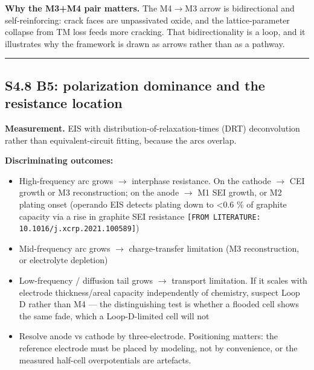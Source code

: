 \documentclass[11pt,a4paper]{article}
\begin{document}
\textbf{Why the M3+M4 pair matters.} The M4\ensuremath{\rightarrow}M3 arrow is bidirectional and self-reinforcing: crack faces are unpassivated oxide, and the lattice-parameter collapse from TM loss feeds more cracking. That bidirectionality is a loop, and it illustrates why the framework is drawn as arrows rather than as a pathway.


\par\noindent\rule{\linewidth}{0.4pt}\par


\subsection*{S4.8 B5: polarization dominance and the resistance location}


\textbf{Measurement.} EIS with distribution-of-relaxation-times (DRT) deconvolution rather than equivalent-circuit fitting, because the arcs overlap.


\textbf{Discriminating outcomes:}


\begin{itemize}
  \item High-frequency arc grows \ensuremath{\rightarrow} interphase resistance. On the cathode \ensuremath{\rightarrow} CEI growth or M3 reconstruction; on the anode \ensuremath{\rightarrow} M1 SEI growth, or M2 plating onset (operando EIS detects plating down to <0.6 \% of graphite capacity via a rise in graphite SEI resistance \texttt{[FROM LITERATU}\hspace{0pt}\texttt{RE: 10.1016/j.}\hspace{0pt}\texttt{xcrp.2021.}\hspace{0pt}\texttt{100589]})
  \item Mid-frequency arc grows \ensuremath{\rightarrow} charge-transfer limitation (M3 reconstruction, or electrolyte depletion)
  \item Low-frequency / diffusion tail grows \ensuremath{\rightarrow} transport limitation. If it scales with electrode thickness/areal capacity independently of chemistry, suspect Loop D rather than M4 --- the distinguishing test is whether a flooded cell shows the same fade, which a Loop-D-limited cell will not
  \item Resolve anode vs cathode by three-electrode. Positioning matters: the reference electrode must be placed by modeling, not by convenience, or the measured half-cell overpotentials are artefacts.
\end{itemize}
\end{document}
